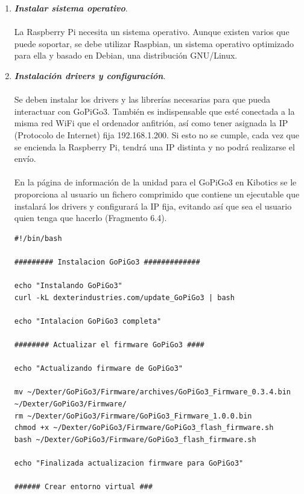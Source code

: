 \documentclass{report}
\begin{document}
\begin{enumerate}
	\item \textit{\textbf{Instalar sistema operativo}}.
	\\
	\\
	La Raspberry Pi necesita un sistema operativo. Aunque existen varios que puede soportar, se debe utilizar Raspbian, un sistema operativo optimizado para ella y basado en Debian, una distribución GNU/Linux.
	\item \textit{\textbf{Instalación drivers y configuración}}. 
	\\
	\\
	Se deben instalar los drivers y las librerías necesarias para que pueda interactuar con GoPiGo3. También es indispensable que esté conectada a la misma red WiFi que el ordenador anfitrión, así como tener asignada la IP (Protocolo de Internet) fija  192.168.1.200. Si esto no se cumple, cada vez que se encienda la Raspberry Pi, tendrá una IP distinta y no podrá realizarse el envío.
	\\
	\\
	En la página de información de la unidad para el GoPiGo3 en Kibotics se le proporciona al usuario un fichero comprimido que contiene un ejecutable que instalará los drivers y configurará la IP fija, evitando así que sea el usuario quien tenga que hacerlo (Fragmento 6.4).
	\\
	\begin{lstlisting}[frame=single,breaklines=true, label=Ejecutable para instalación y configuración de la Raspberry Pi, caption=Ejecutable para instalación y configuración de la Raspberry Pi,  captionpos=b]
#!/bin/bash

######### Instalacion GoPiGo3 #############

echo "Instalando GoPiGo3"
curl -kL dexterindustries.com/update_GoPiGo3 | bash

echo "Intalacion GoPiGo3 completa"

######## Actualizar el firmware GoPiGo3 ####

echo "Actualizando firmware de GoPiGo3"

mv ~/Dexter/GoPiGo3/Firmware/archives/GoPiGo3_Firmware_0.3.4.bin ~/Dexter/GoPiGo3/Firmware/
rm ~/Dexter/GoPiGo3/Firmware/GoPiGo3_Firmware_1.0.0.bin
chmod +x ~/Dexter/GoPiGo3/Firmware/GoPiGo3_flash_firmware.sh
bash ~/Dexter/GoPiGo3/Firmware/GoPiGo3_flash_firmware.sh

echo "Finalizada actualizacion firmware para GoPiGo3"

###### Crear entorno virtual ###


\end{lstlisting}
\end{enumerate}
\end{document}
